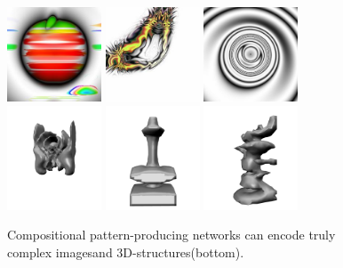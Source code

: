 \begin{figure}[t!]
\centering
\includegraphics[width=0.25\textwidth]{../Figures/Misc/picBreed3.jpg}\quad   
\includegraphics[width=0.25\textwidth]{../Figures/Misc/picBreed2.jpg}\quad
\includegraphics[width=0.25\textwidth]{../Figures/Misc/picBreed1.jpg}\\
\includegraphics[width=0.25\textwidth]{../Figures/Misc/endless2.png}\quad 
\includegraphics[width=0.25\textwidth]{../Figures/Misc/endless1.png}\quad
\includegraphics[width=0.25\textwidth]{../Figures/Misc/endless3.png}
\caption{Compositional pattern-producing networks can encode truly complex images\protect\footnotemark[1] and 3D-structures\protect\footnotemark[2] (bottom).}
\label{fig:cppnImages}
\end{figure}

